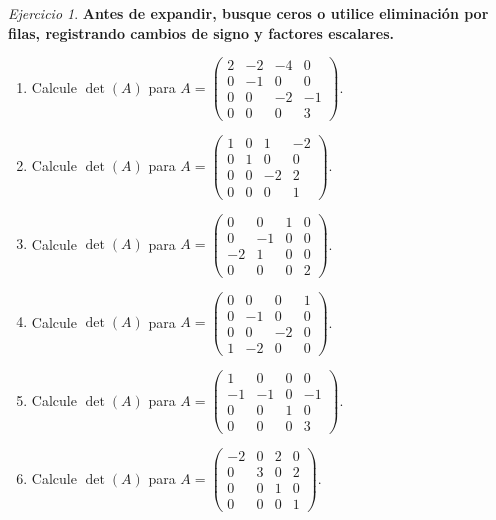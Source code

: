 \documentclass[12pt]{article}
\theoremstyle{remark}
\newtheorem{Ejer}[definicion]{Ejercicio}
\begin{document}
\begin{Ejer}

\textbf{Antes de expandir, busque ceros o utilice eliminación por filas, registrando cambios de signo y factores escalares.}
\begin{enumerate}[resume=banco]

\item Calcule $\det(A)$ para $A=\begin{pmatrix}2&-2&-4&0\\0&-1&0&0\\0&0&-2&-1\\0&0&0&3\end{pmatrix}$.

\item Calcule $\det(A)$ para $A=\begin{pmatrix}1&0&1&-2\\0&1&0&0\\0&0&-2&2\\0&0&0&1\end{pmatrix}$.

\item Calcule $\det(A)$ para $A=\begin{pmatrix}0&0&1&0\\0&-1&0&0\\-2&1&0&0\\0&0&0&2\end{pmatrix}$.

\item Calcule $\det(A)$ para $A=\begin{pmatrix}0&0&0&1\\0&-1&0&0\\0&0&-2&0\\1&-2&0&0\end{pmatrix}$.

\item Calcule $\det(A)$ para $A=\begin{pmatrix}1&0&0&0\\-1&-1&0&-1\\0&0&1&0\\0&0&0&3\end{pmatrix}$.

\item Calcule $\det(A)$ para $A=\begin{pmatrix}-2&0&2&0\\0&3&0&2\\0&0&1&0\\0&0&0&1\end{pmatrix}$.


\end{enumerate}
\end{Ejer}
\end{document}

